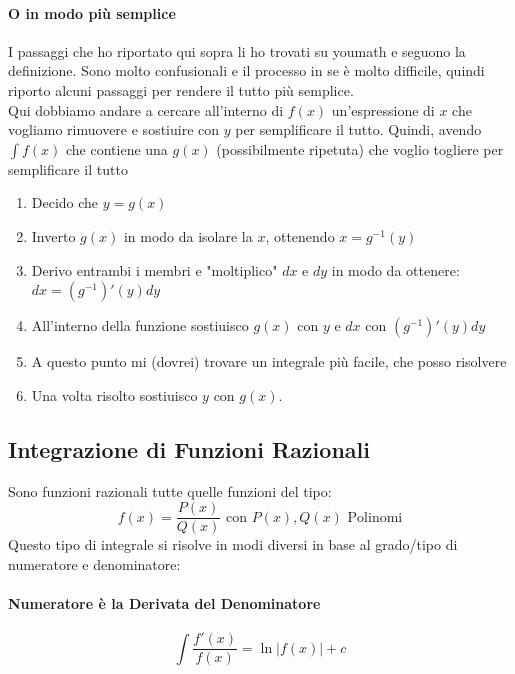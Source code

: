 \documentclass[12pt, a4paper, openany]{book}
\begin{document}
	\paragraph*{O in modo più semplice}
	I passaggi che ho riportato qui sopra li ho trovati su youmath e seguono la definizione.
	Sono molto confusionali e il processo in se è molto difficile, quindi riporto alcuni passaggi per rendere il tutto più semplice.
	\\Qui dobbiamo andare a cercare all'interno di $f(x)$ un'espressione di $x$ che vogliamo rimuovere e sostiuire con $y$ per semplificare il tutto.
	Quindi, avendo $\int f(x)$ che contiene una $g(x)$ (possibilmente ripetuta) che voglio togliere per semplificare il tutto
	\begin{enumerate}
		\item Decido che $y=g(x)$
		\item Inverto $g(x)$ in modo da isolare la $x$, ottenendo $x=g^{-1}(y)$
		\item Derivo entrambi i membri e "moltiplico" $dx$ e $dy$ in modo da ottenere: $dx=(g^{-1})'(y)dy$
		\item All'interno della funzione sostiuisco $g(x)$ con $y$ e $dx$ con $(g^{-1})'(y)dy$
		\item A questo punto mi (dovrei) trovare un integrale più facile, che posso risolvere
		\item Una volta risolto sostiuisco $y$ con $g(x)$.
	\end{enumerate}



	\subsection{Integrazione di Funzioni Razionali}
	Sono funzioni razionali tutte quelle funzioni del tipo:
	$$f(x)=\frac{P(x)}{Q(x)} \text{ con } P(x),Q(x) \text{ Polinomi} $$
	Questo tipo di integrale si risolve in modi diversi in base al grado/tipo di numeratore e denominatore:
	\paragraph*{Numeratore è la Derivata del Denominatore}
	$$\int \frac{f'(x)}{f(x)} = \ln|f(x)|+ c$$
\end{document}
